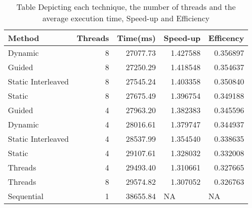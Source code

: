 \documentclass[journal,transmag]{IEEEtran}
\begin{document}
	\begin{table}[]
		\centering
		\caption{Table Depicting each technique, the number of threads and the average execution time, Speed-up and Efficiency}
		\label{runTimeTable}
		\begin{tabular}{|l|r|r|r|r|}
			\hline
			\textbf{Method}    & \multicolumn{1}{l|}{\textbf{Threads}} & \multicolumn{1}{l|}{\textbf{Time(ms)}} & \multicolumn{1}{l|}{\textbf{Speed-up}} & \multicolumn{1}{l|}{\textbf{Efficency}} \\ \hline
			Dynamic            & 8                                     & 27077.73                               & 1.427588                               & 0.356897                                \\ \hline
			Guided             & 8                                     & 27250.29                               & 1.418548                               & 0.354637                                \\ \hline
			Static Interleaved & 8                                     & 27545.24                               & 1.403358                               & 0.350840                                \\ \hline
			Static             & 8                                     & 27675.49                               & 1.396754                               & 0.349188                                \\ \hline
			Guided             & 4                                     & 27963.20                               & 1.382383                               & 0.345596                                \\ \hline
			Dynamic            & 4                                     & 28016.61                               & 1.379747                               & 0.344937                                \\ \hline
			Static Interleaved & 4                                     & 28537.99                               & 1.354540                               & 0.338635                                \\ \hline
			Static             & 4                                     & 29107.61                               & 1.328032                               & 0.332008                                \\ \hline
			Threads            & 4                                     & 29493.40                               & 1.310661                               & 0.327665                                \\ \hline
			Threads            & 8                                     & 29574.82                               & 1.307052                               & 0.326763                                \\ \hline
			Sequential         & 1                                     & 38655.84                               & \multicolumn{1}{l|}{NA}                & \multicolumn{1}{l|}{NA}                 \\ \hline
		\end{tabular}
	\end{table}
	
\end{document}
